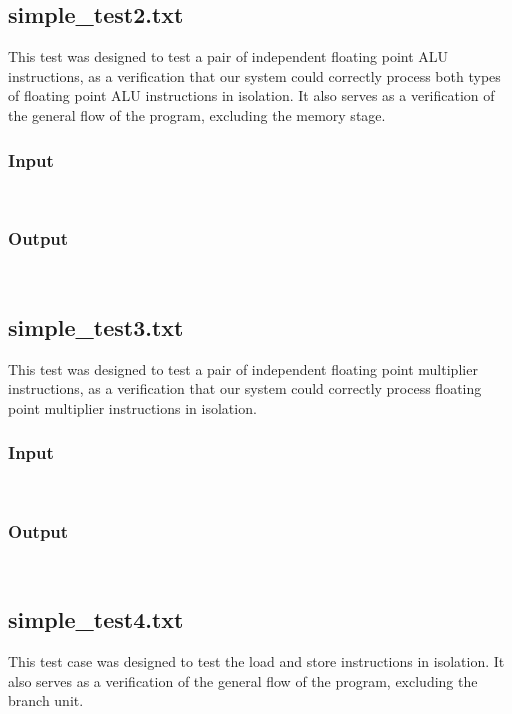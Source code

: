 \documentclass[12pt]{article}
\begin{document}
\subsection{simple\_test2.txt}
This test was designed to test a pair of independent floating point ALU instructions, as a verification that our system could correctly process both types of floating point ALU instructions in isolation.  It also serves as a verification of the general flow of the program, excluding the memory stage.

\subsubsection*{Input}
\begin{verbatim}
    
\end{verbatim}

\subsubsection*{Output}
\begin{verbatim}
    
\end{verbatim}


\subsection{simple\_test3.txt}
This test was designed to test a pair of independent floating point multiplier instructions, as a verification that our system could correctly process floating point multiplier instructions in isolation.

\subsubsection*{Input}
\begin{verbatim}
    
\end{verbatim}

\subsubsection*{Output}
\begin{verbatim}
    
\end{verbatim}

\subsection{simple\_test4.txt}
This test case was designed to test the load and store instructions in isolation.  It also serves as a verification of the general flow of the program, excluding the branch unit.
\end{document}

